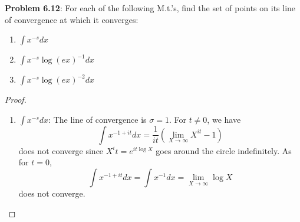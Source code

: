 \documentclass[12pt]{article}
\begin{document}
\fi

\textbf{Problem 6.12}: For each of the following M.t.'s, find the set of points on its line of convergence at which it converges:
\begin{enumerate}
\item $\int x^{-s} dx$
\item $\int x^{-s} \log(ex)^{-1} dx$
\item $\int x^{-s} \log(ex)^{-2} dx$
\end{enumerate}

\begin{proof}
\begin{enumerate}
\item $\int x^{-s} dx$: The line of convergence is $\sigma = 1$. For $t \not= 0$, we have
$$\int x^{-1+it} dx = \frac{1}{it} (\lim_{X \rightarrow \infty} X^{it} - 1)$$
does not converge since $X^it = e^{i t \log X}$ goes around the circle indefinitely. As for $t = 0$,
$$\int x^{-1+it} dx = \int x^{-1} dx = \lim_{X \rightarrow \infty} \log X$$
does not converge.


\end{enumerate}
\end{proof}
\end{document}
